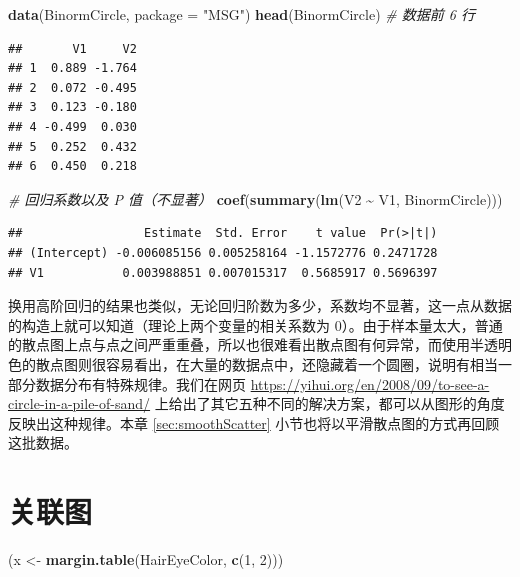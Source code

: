 \documentclass[
  b5paper,
  UTF8,twoside]{book}
\newenvironment{Shaded}{\begin{snugshade}}{\end{snugshade}}
\newcommand{\AttributeTok}[1]{\textcolor[rgb]{0.13,0.29,0.53}{#1}}
\newcommand{\CommentTok}[1]{\textcolor[rgb]{0.56,0.35,0.01}{\textit{#1}}}
\newcommand{\DecValTok}[1]{\textcolor[rgb]{0.00,0.00,0.81}{#1}}
\newcommand{\FunctionTok}[1]{\textcolor[rgb]{0.13,0.29,0.53}{\textbf{#1}}}
\newcommand{\NormalTok}[1]{#1}
\newcommand{\OtherTok}[1]{\textcolor[rgb]{0.56,0.35,0.01}{#1}}
\newcommand{\SpecialCharTok}[1]{\textcolor[rgb]{0.81,0.36,0.00}{\textbf{#1}}}
\newcommand{\StringTok}[1]{\textcolor[rgb]{0.31,0.60,0.02}{#1}}
\begin{document}
\begin{Shaded}
\begin{Highlighting}[]
\FunctionTok{data}\NormalTok{(BinormCircle, }\AttributeTok{package =} \StringTok{"MSG"}\NormalTok{)}
\FunctionTok{head}\NormalTok{(BinormCircle) }\CommentTok{\# 数据前 6 行}
\end{Highlighting}
\end{Shaded}

\begin{verbatim}
##       V1     V2
## 1  0.889 -1.764
## 2  0.072 -0.495
## 3  0.123 -0.180
## 4 -0.499  0.030
## 5  0.252  0.432
## 6  0.450  0.218
\end{verbatim}

\begin{Shaded}
\begin{Highlighting}[]
\CommentTok{\# 回归系数以及 P 值（不显著）}
\FunctionTok{coef}\NormalTok{(}\FunctionTok{summary}\NormalTok{(}\FunctionTok{lm}\NormalTok{(V2 }\SpecialCharTok{\textasciitilde{}}\NormalTok{ V1, BinormCircle)))}
\end{Highlighting}
\end{Shaded}

\begin{verbatim}
##                 Estimate  Std. Error    t value  Pr(>|t|)
## (Intercept) -0.006085156 0.005258164 -1.1572776 0.2471728
## V1           0.003988851 0.007015317  0.5685917 0.5696397
\end{verbatim}

换用高阶回归的结果也类似，无论回归阶数为多少，系数均不显著，这一点从数据的构造上就可以知道（理论上两个变量的相关系数为 0）。由于样本量太大，普通的散点图上点与点之间严重重叠，所以也很难看出散点图有何异常，而使用半透明色的散点图则很容易看出，在大量的数据点中，还隐藏着一个圆圈，说明有相当一部分数据分布有特殊规律。我们在网页 \url{https://yihui.org/en/2008/09/to-see-a-circle-in-a-pile-of-sand/}
上给出了其它五种不同的解决方案，都可以从图形的角度反映出这种规律。本章 \ref{sec:smoothScatter} 小节也将以平滑散点图的方式再回顾这批数据。

\section{关联图}\label{sec:assocplot}





\begin{Shaded}
\begin{Highlighting}[]
\NormalTok{(x }\OtherTok{\textless{}{-}} \FunctionTok{margin.table}\NormalTok{(HairEyeColor, }\FunctionTok{c}\NormalTok{(}\DecValTok{1}\NormalTok{, }\DecValTok{2}\NormalTok{)))}
\end{Highlighting}
\end{Shaded}
\end{document}
